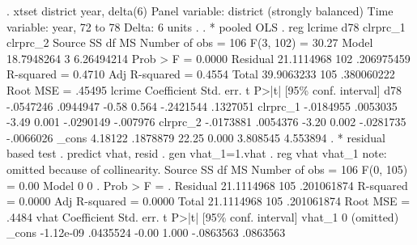 . xtset district year, delta(6)
{\smallskip}
Panel variable: district (strongly balanced)
 Time variable: year, 72 to 78
         Delta: 6 units
{\smallskip}
. 
. * pooled OLS
. reg lcrime d78 clrprc_1 clrprc_2
{\smallskip}
      Source {\VBAR}       SS           df       MS      Number of obs   =       106
   F(3, 102)       =     30.27
       Model {\VBAR}  18.7948264         3  6.26494214   Prob > F        =    0.0000
    Residual {\VBAR}  21.1114968       102  .206975459   R-squared       =    0.4710
   Adj R-squared   =    0.4554
       Total {\VBAR}  39.9063233       105  .380060222   Root MSE        =    .45495
{\smallskip}
      lcrime {\VBAR} Coefficient  Std. err.      t    P>|t|     [95\% conf. interval]
         d78 {\VBAR}  -.0547246   .0944947    -0.58   0.564    -.2421544    .1327051
    clrprc_1 {\VBAR}  -.0184955   .0053035    -3.49   0.001    -.0290149    -.007976
    clrprc_2 {\VBAR}  -.0173881   .0054376    -3.20   0.002    -.0281735   -.0066026
       _cons {\VBAR}    4.18122   .1878879    22.25   0.000     3.808545    4.553894
{\smallskip}
. * residual based test 
. predict vhat, resid
{\smallskip}
. gen vhat_1=1.vhat
{\smallskip}
. reg vhat vhat_1
note: {} omitted because of collinearity.
{\smallskip}
      Source {\VBAR}       SS           df       MS      Number of obs   =       106
   F(0, 105)       =      0.00
       Model {\VBAR}           0         0           .   Prob > F        =         .
    Residual {\VBAR}  21.1114968       105  .201061874   R-squared       =    0.0000
   Adj R-squared   =    0.0000
       Total {\VBAR}  21.1114968       105  .201061874   Root MSE        =     .4484
{\smallskip}
        vhat {\VBAR} Coefficient  Std. err.      t    P>|t|     [95\% conf. interval]
      vhat_1 {\VBAR}          0  (omitted)
       _cons {\VBAR}  -1.12e-09   .0435524    -0.00   1.000    -.0863563    .0863563
{\smallskip}
